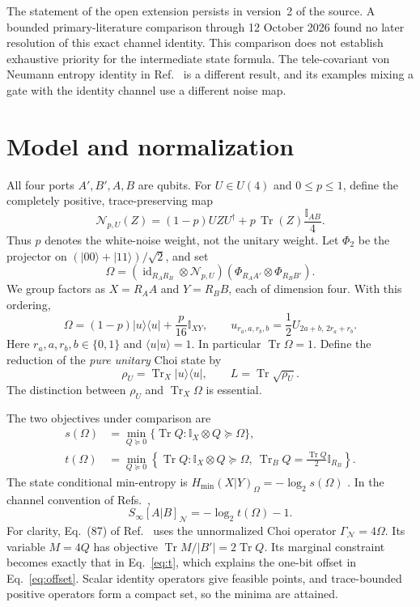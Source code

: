 \documentclass[11pt]{article}
\newcommand{\Tr}{\operatorname{Tr}}
\newcommand{\id}{\operatorname{id}}
\newcommand{\I}{\mathbb{I}}
\newcommand{\ket}[1]{|#1\rangle}
\newcommand{\bra}[1]{\langle#1|}
\begin{document}
The statement of the open extension persists in version~2 of the source.
A bounded primary-literature comparison through 12 October 2026 found
no later resolution of this exact channel identity. This comparison does
not establish exhaustive priority for the intermediate state formula.
The tele-covariant von Neumann entropy identity in
Ref.~\cite{Das2024} is a different result, and its examples mixing a gate
with the identity channel use a different noise map.

\section{Model and normalization}
All four ports $A',B',A,B$ are qubits. For $U\in U(4)$ and $0\leq p\leq1$,
define the completely positive, trace-preserving map
\begin{equation}
 \mathcal N_{p,U}(Z)=(1-p)UZU^\dagger
                  +p\,\Tr(Z)\frac{\I_{AB}}4 .
 \label{eq:channel}
\end{equation}
Thus $p$ denotes the white-noise weight, not the unitary weight.
Let $\Phi_2$ be the projector on
$(\ket{00}+\ket{11})/\sqrt2$, and set
\begin{equation}
 \Omega=(\id_{R_AR_B}\otimes\mathcal N_{p,U})
       (\Phi_{R_AA'}\otimes\Phi_{R_BB'}).
\end{equation}
We group factors as $X=R_AA$ and $Y=R_BB$, each of dimension four.
With this ordering,
\begin{equation}
 \Omega=(1-p)\ket u\bra u+\frac{p}{16}\I_{XY},\qquad
 u_{r_a,a,r_b,b}=\frac12 U_{2a+b,\,2r_a+r_b}.
 \label{eq:choi}
\end{equation}
Here $r_a,a,r_b,b\in\{0,1\}$ and $\bra u u\rangle=1$.
In particular $\Tr\Omega=1$.
Define the reduction of the \emph{pure unitary} Choi state by
\begin{equation}
 \rho_U=\Tr_X\ket u\bra u,\qquad L=\Tr\sqrt{\rho_U}.
 \label{eq:rho}
\end{equation}
The distinction between $\rho_U$ and $\Tr_X\Omega$ is essential.

The two objectives under comparison are
\begin{align}
 s(\Omega)&=\min_{Q\succeq0}
       \{\Tr Q:\I_X\otimes Q\succeq\Omega\}, \label{eq:s}\\
 t(\Omega)&=\min_{Q\succeq0}
       \left\{\Tr Q:\I_X\otimes Q\succeq\Omega,\
       \Tr_B Q=\frac{\Tr Q}{2}\I_{R_B}\right\}. \label{eq:t}
\end{align}
The state conditional min-entropy is
$H_{\min}(X|Y)_\Omega=-\log_2 s(\Omega)$
\cite{KRS2009}.
In the channel convention of Refs.~\cite{Das2024,Badhani2026},
\begin{equation}
 S_\infty[A|B]_{\mathcal N}=-\log_2 t(\Omega)-1.
 \label{eq:offset}
\end{equation}
For clarity, Eq.~(87) of Ref.~\cite{Das2024} uses the unnormalized
Choi operator $\Gamma_{\mathcal N}=4\Omega$.
Its variable $M=4Q$ has objective $\Tr M/|B'|=2\Tr Q$.
Its marginal constraint becomes exactly that in Eq.~\eqref{eq:t},
which explains the one-bit offset in Eq.~\eqref{eq:offset}.
Scalar identity operators give feasible points, and trace-bounded
positive operators form a compact set, so the minima are attained.
\end{document}
